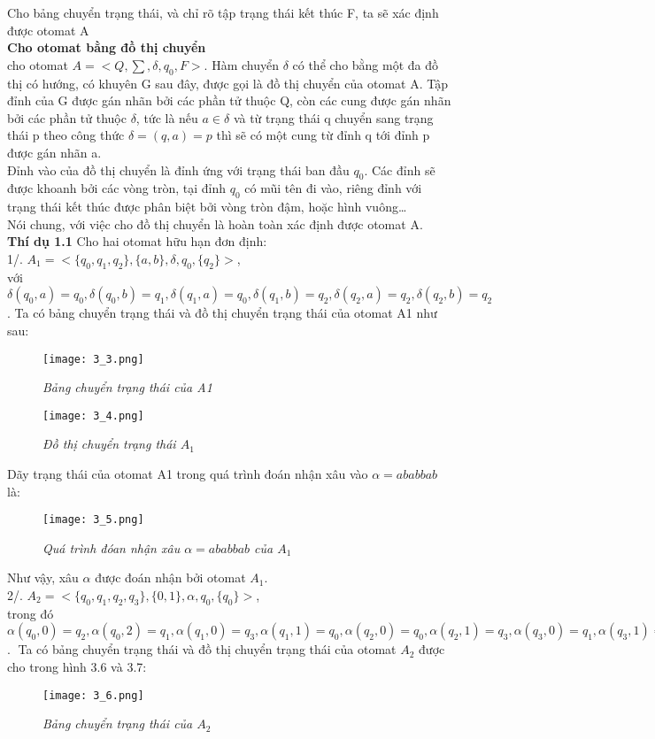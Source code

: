 \begin{flushleft}
Cho bảng chuyển trạng thái, và chỉ rõ tập trạng thái kết thúc F, ta sẽ xác định được otomat A\\
\textbf{Cho otomat bằng đồ thị chuyển}\\
cho otomat  $A = <Q, \sum, \delta, q_0, F>$. Hàm chuyển $\delta$ có thể cho bằng một đa đồ thị có hướng, có khuyên G sau đây, được gọi là đồ thị chuyển của otomat A. Tập đỉnh của G được gán nhãn bởi các phần tử thuộc Q, còn các cung được gán nhãn bởi các phần tử thuộc $\delta$, tức là nếu $a \in \delta$ và từ trạng thái q chuyển sang trạng thái p theo công thức $\delta = (q,a) = p$ thì sẽ có một cung từ đỉnh q tới đỉnh p được gán nhãn a.\\
Đỉnh vào của đồ thị chuyển là đỉnh ứng với trạng thái ban đầu $q_0$. Các đỉnh sẽ được khoanh bởi các vòng tròn, tại đỉnh $q_0$ có mũi tên đi vào, riêng đỉnh với trạng thái kết thúc được phân biệt bởi vòng tròn đậm, hoặc hình vuông…\\
Nói chung, với việc cho đồ thị chuyển là hoàn toàn xác định được otomat A.\\
\textbf{Thí dụ 1.1 } Cho hai otomat hữu hạn đơn định:\\
1/. $A_1 = <\{ q_0, q_1, q_2 \}, \{ a,b \}, \delta, q_0, \{ q_2 \}>$,\\
với $\delta(q_0, a) = q_0, \delta(q_0, b) = q_1, \delta(q_1, a) = q_0, \delta(q_1, b) = q_2, \delta(q_2, a) = q_2, \delta(q_2, b)=q_2$.
Ta có bảng chuyển trạng thái và đồ thị chuyển trạng thái của otomat A1 như sau:\\
\begin{figure}[ht]
\texttt{[image: 3\_3.png]}
\caption{ \textit{ Bảng chuyển trạng thái của A1} }
\end{figure}

\begin{figure}[ht]
\texttt{[image: 3\_4.png]}
\caption{ \textit{Đồ thị chuyển trạng thái $A_1$} }
\end{figure}
Dãy trạng thái của otomat A1 trong quá trình đoán nhận xâu vào $\alpha = ababbab$ là:\\
\begin{figure}[ht]
\texttt{[image: 3\_5.png]}
\caption{ \textit{Quá trình đóan nhận xâu $\alpha = ababbab$ của $A_1$} }
\end{figure}
Như vậy, xâu $\alpha$ được đoán nhận bởi otomat $A_1$.\\
2/. $A_2 = <\{q_0,q_1,q_2,q_3\}, \{0,1\}, \alpha, q_0, \{q_0\}>$, \\
trong đó $\alpha(q_0, 0) = q_2, \alpha(q_0, 2) = q_1, \alpha(q_1, 0) = q_3, \alpha(q_1, 1) = q_0, \alpha(q_2, 0) = q_0, \alpha(q_2, 1) = q_3, \alpha(q_3, 0) = q_1, \alpha(q_3, 1) = q_2$.
Ta có bảng chuyển trạng thái và đồ thị chuyển trạng thái của otomat $A_2$ được cho trong hình 3.6 và 3.7: 
\begin{figure}[ht]
\texttt{[image: 3\_6.png]}
\caption{ \textit{Bảng chuyển trạng thái của $A_2$} }
\end{figure}


\end{flushleft}
